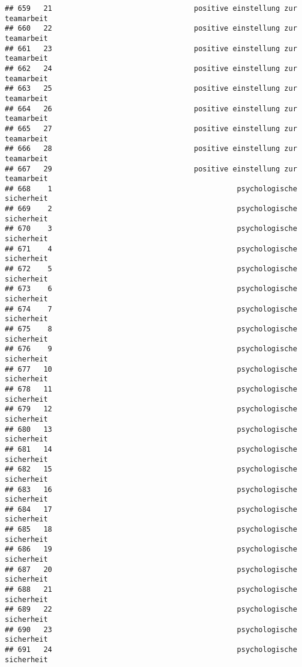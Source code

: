 \documentclass[
]{article}
\begin{document}
\begin{verbatim}
## 659   21                                 positive einstellung zur teamarbeit
## 660   22                                 positive einstellung zur teamarbeit
## 661   23                                 positive einstellung zur teamarbeit
## 662   24                                 positive einstellung zur teamarbeit
## 663   25                                 positive einstellung zur teamarbeit
## 664   26                                 positive einstellung zur teamarbeit
## 665   27                                 positive einstellung zur teamarbeit
## 666   28                                 positive einstellung zur teamarbeit
## 667   29                                 positive einstellung zur teamarbeit
## 668    1                                           psychologische sicherheit
## 669    2                                           psychologische sicherheit
## 670    3                                           psychologische sicherheit
## 671    4                                           psychologische sicherheit
## 672    5                                           psychologische sicherheit
## 673    6                                           psychologische sicherheit
## 674    7                                           psychologische sicherheit
## 675    8                                           psychologische sicherheit
## 676    9                                           psychologische sicherheit
## 677   10                                           psychologische sicherheit
## 678   11                                           psychologische sicherheit
## 679   12                                           psychologische sicherheit
## 680   13                                           psychologische sicherheit
## 681   14                                           psychologische sicherheit
## 682   15                                           psychologische sicherheit
## 683   16                                           psychologische sicherheit
## 684   17                                           psychologische sicherheit
## 685   18                                           psychologische sicherheit
## 686   19                                           psychologische sicherheit
## 687   20                                           psychologische sicherheit
## 688   21                                           psychologische sicherheit
## 689   22                                           psychologische sicherheit
## 690   23                                           psychologische sicherheit
## 691   24                                           psychologische sicherheit

\end{verbatim}
\end{document}
